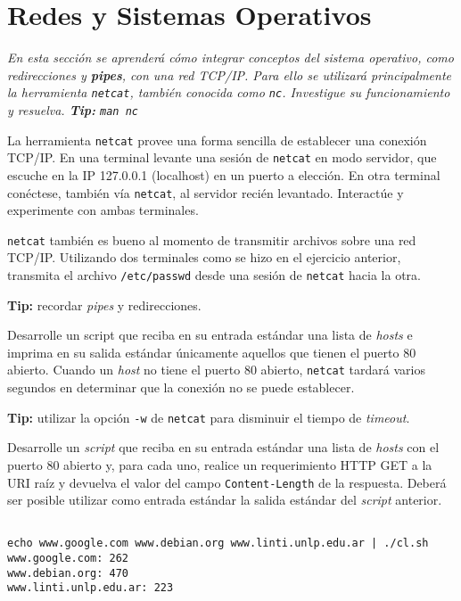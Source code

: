 \section{Redes y Sistemas Operativos}

\textit{En esta sección se aprenderá cómo integrar conceptos del sistema
  operativo, como redirecciones y \textbf{pipes}, con una red TCP/IP. Para
  ello se utilizará principalmente la herramienta \texttt{netcat}, también
  conocida como \texttt{nc}. Investigue
  su funcionamiento y resuelva. \textbf{Tip:} \texttt{man nc}}

\begin{questions}
  \question La herramienta \texttt{netcat} provee una forma sencilla de
  establecer una conexión TCP/IP. En una terminal levante una sesión de
  \texttt{netcat} en modo servidor, que escuche en la IP 127.0.0.1
  (localhost) en un puerto a elección. En otra terminal conéctese, también
  vía \texttt{netcat}, al servidor recién levantado. Interactúe y
  experimente con ambas terminales.

  \question \texttt{netcat} también es bueno al momento de transmitir
  archivos sobre una red TCP/IP. Utilizando dos terminales como se hizo en
  el ejercicio anterior, transmita el archivo \texttt{/etc/passwd} desde
  una sesión de \texttt{netcat} hacia la otra.

  \textbf{Tip:} recordar \textit{pipes} y redirecciones.

  \question Desarrolle un script que reciba en su entrada estándar una
  lista de \textit{hosts} e imprima en su salida estándar únicamente
  aquellos que tienen el puerto 80 abierto. Cuando un \textit{host} no
  tiene el puerto 80 abierto, \texttt{netcat} tardará varios segundos en
  determinar que la conexión no se puede establecer.

  \textbf{Tip:} utilizar la opción \texttt{-w} de \texttt{netcat} para
  disminuir el tiempo de \textit{timeout}.

  \question Desarrolle un \textit{script} que reciba en su entrada estándar
  una lista de \textit{hosts} con el puerto 80 abierto y, para cada uno,
  realice un requerimiento HTTP GET a la URI raíz y devuelva el valor del
  campo \texttt{Content-Length} de la respuesta. Deberá ser posible
  utilizar como entrada estándar la salida estándar del \textit{script}
  anterior.
  \begin{lstlisting}

echo www.google.com www.debian.org www.linti.unlp.edu.ar | ./cl.sh
www.google.com: 262
www.debian.org: 470
www.linti.unlp.edu.ar: 223


\end{lstlisting}
\end{questions}
